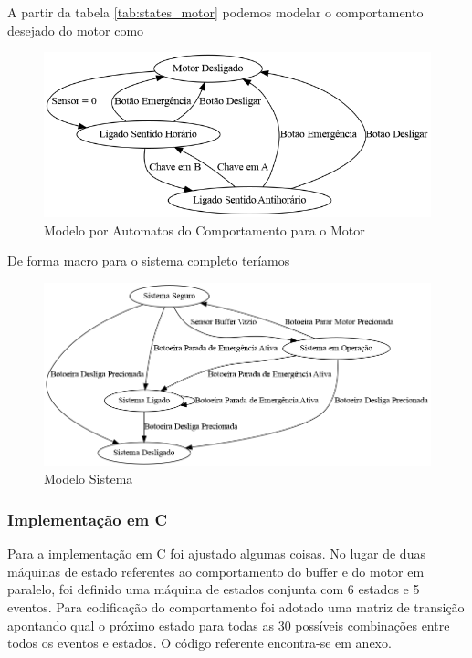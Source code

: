 \documentclass[a4paper,11pt]{article}
\begin{document}
A partir da tabela \ref{tab:states_motor} podemos modelar o comportamento desejado do motor como

\begin{figure}[H]
    \centering
    \includegraphics[width=0.9\linewidth]{src/tex/img/automato_motor.png}
    \caption{Modelo por Automatos do Comportamento para o Motor}
    \label{fig:automato_motor}
\end{figure}

De forma macro para o sistema completo teríamos

\begin{figure}[H]
    \centering
    \includegraphics[width=0.9\linewidth]{src/tex/img/automato_sistema.png}
    \caption{Modelo Sistema}
    \label{fig:automato_sistema}
\end{figure}

\subsubsection{Implementação em C}

Para a implementação em C foi ajustado algumas coisas. No lugar de duas máquinas de estado referentes ao comportamento do buffer e do motor em paralelo, foi definido uma máquina de estados conjunta com 6 estados e 5 eventos. Para codificação do comportamento foi adotado uma matriz de transição apontando qual o próximo estado para todas as 30 possíveis combinações entre todos os eventos e estados. O código referente encontra-se em anexo.
\end{document}
